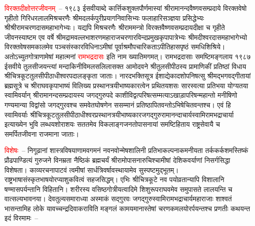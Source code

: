 \begin{sloppypar}\justifying\noindent\hspace{10mm} \textcolor{red}{विरक्तदीक्षोत्तरजीवनम्}~– १९८३ ईसवीयाब्दे कार्त्तिक\-शुक्ल\-पौर्णमास्यां श्रीरामानन्द\-वैष्णव\-सम्प्रदाये विरक्तवेषो गृहीतो गिरिधर\-लाल\-मिश्र\-चरणैः श्रीमदलर्क\-पुरी\-प्रयाग\-निवासिभ्यः फलाहारि\-सञ्ज्ञया प्रसिद्धेभ्यः श्रीश्रीरामचरण\-दास\-महाभागेभ्यः। यद्यपि मिश्रचरणैः श्रीराममन्त्रो विरक्त\-वैष्णव\-सम्प्रदाय\-दीक्षा च गृहीते जीवनस्याष्टम एव वर्षे श्रीमद्राम\-वल्लभा\-शरण\-महाराज\-चरणारविन्द\-प्रमुख\-कृपा\-पात्रेभ्यः श्रीमदीश्वर\-दास\-महाभागेभ्यो विरक्तवेष\-समकालमेव पञ्चसंस्कार\-विधिनाऽमीषां पूर्वाश्रमौप\-चारिकताऽपीतिहासपृष्ठं समधिशिश्रिये। अतोऽच्युत\-गोत्राणामेषां महात्मनां \textcolor{red}{रामभद्रदासः} इति नाम ख्यातिमगमत्। रामभद्रदासाः समष्टि\-मङ्गलाय १९८७ ईसवीये तुलसीजयन्त्यां मन्दाकिनी\-विमल\-सलिलासक्त आमोदवने श्रीतुलसीपीठस्य प्रामाणिकीं प्रतिष्ठां विधाय श्रीचित्रकूट\-तुलसी\-पीठाधीश्वर\-पदालङ्कृता जाताः। नारदभक्तिसूत्र ईशाद्येकादशोपनिषत्सु श्रीमद्भगवद्गीतायां ब्रह्मसूत्रे च श्रीराघवकृपाभाष्यं विलिख्य प्रस्थानत्रयी\-भाष्य\-कारत्वेन प्रथितयशसः सारस्वत्या प्रतिभया योग्यतया स्वामिवर्यान् श्रीरामानन्द\-सम्प्रदायस्य जगद्गुरुपदे काशीविद्वत्परिषत्सम्मत्याऽखाड़ा\-परिषन्महान्तो मनीषिणो गण्यमान्या विद्वांसो जगद्गुरवश्च समवेतघोषणेन ससम्मानं प्रतिष्ठापितवन्तोऽभि\-षेचितवन्तश्च। एवं हि स्वामिवर्याः श्रीचित्रकूट\-तुलसी\-पीठाधीश्वर\-प्रस्थानत्रयी\-भाष्यकार\-जगद्गुरु\-रामानन्दाचार्य\-स्वामि\-रामभद्राचार्या इत्याख्येन भुवि लब्धयशोराशयः सततमेव विकलाङ्ग\-जनतोपासनायां समष्टि\-हिताय राष्ट्रसेवायै च समर्पितजीवना राजमाना जाताः।\end{sloppypar}
\begin{sloppypar}\justifying\noindent\hspace{10mm} \textcolor{red}{विशेषः}~– निगूढानां शास्त्रविषयाणामवगमनं नव\-नवोन्मेष\-शालिनी प्रतिभा\-कल्पना\-कमनीयता तर्ककर्कश\-मस्तिष्कं प्रौढ\-पाण्डित्यं गुरुजने विनम्रता नैष्ठिकं ब्रह्मचर्यं श्रीरामोपासना\-रुचिश्चामीषां देशिकवर्याणां निसर्गसिद्धा विशेषता। काव्य\-रचना\-पाटवं त्वमीषां सार्धत्रिवर्षावस्थायामेव सुस्पष्टमुद्भूतम्। राष्ट्रभाषा\-संस्कृत\-भाषयोरप्याशु\-कवित्वं सहजसिद्धम्। एभिः श्रीचित्रकूटे नव पयोव्रतान्यापि विशालानि षण्मासपर्यन्तानि विहितानि। शरीरस्य वसिष्ठ\-गोत्रीयत्वादिमे शिशु\-रूप\-राघवमेव समुपासते लालयन्ति च वात्सल्य\-भावनया। देवतुल्यसमाराध्या अस्माकं सद्गुरवः जगद्गुरु\-स्वामि\-रामभद्राचार्य\-महाराजाः शाश्वतं भासन्तामिह लोके यावच्चन्द्र\-दिवाकराविति मङ्गलं कामयमानास्तेषां चरणकमलयोरर्पयन्तश्च प्रणतीः कथयन्त इदं विरमामः~–\end{sloppypar}

